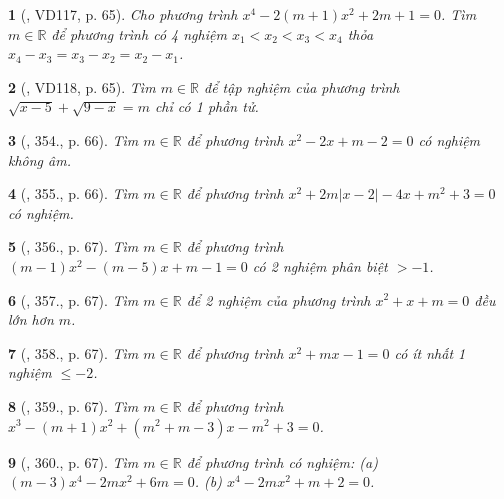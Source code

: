\documentclass{article}
\newtheorem{baitoan}{}
\begin{document}
\begin{baitoan}[\cite{Binh_Toan_9_tap_2}, VD117, p. 65]
	Cho phương trình $x^4 - 2(m + 1)x^2 + 2m + 1 = 0$. Tìm $m\in\mathbb{R}$ để phương trình có 4 nghiệm $x_1 < x_2 < x_3 < x_4$ thỏa $x_4 - x_3 = x_3 - x_2 = x_2 - x_1$.
\end{baitoan}

\begin{baitoan}[\cite{Binh_Toan_9_tap_2}, VD118, p. 65]
	Tìm $m\in\mathbb{R}$ để tập nghiệm của phương trình $\sqrt{x - 5} + \sqrt{9 - x} = m$ chỉ có 1 phần tử.
\end{baitoan}

\begin{baitoan}[\cite{Binh_Toan_9_tap_2}, 354., p. 66]
	Tìm $m\in\mathbb{R}$ để phương trình $x^2 - 2x + m - 2 = 0$ có nghiệm không âm.
\end{baitoan}

\begin{baitoan}[\cite{Binh_Toan_9_tap_2}, 355., p. 66]
	Tìm $m\in\mathbb{R}$ để phương trình $x^2 + 2m|x - 2| - 4x + m^2 + 3 = 0$ có nghiệm.
\end{baitoan}

\begin{baitoan}[\cite{Binh_Toan_9_tap_2}, 356., p. 67]
	Tìm $m\in\mathbb{R}$ để phương trình $(m - 1)x^2 - (m - 5)x + m - 1 = 0$ có 2 nghiệm phân biệt $> -1$.
\end{baitoan}

\begin{baitoan}[\cite{Binh_Toan_9_tap_2}, 357., p. 67]
	Tìm $m\in\mathbb{R}$ để 2 nghiệm của phương trình $x^2 + x + m = 0$ đều lớn hơn $m$.
\end{baitoan}

\begin{baitoan}[\cite{Binh_Toan_9_tap_2}, 358., p. 67]
	Tìm $m\in\mathbb{R}$ để phương trình $x^2 + mx - 1 = 0$ có ít nhất 1 nghiệm $\le-2$.
\end{baitoan}

\begin{baitoan}[\cite{Binh_Toan_9_tap_2}, 359., p. 67]
	Tìm $m\in\mathbb{R}$ để phương trình $x^3 - (m + 1)x^2 + (m^2 + m - 3)x - m^2 + 3 = 0$.
\end{baitoan}

\begin{baitoan}[\cite{Binh_Toan_9_tap_2}, 360., p. 67]
	Tìm $m\in\mathbb{R}$ để phương trình có nghiệm: (a) $(m - 3)x^4 - 2mx^2 + 6m = 0$. (b) $x^4 - 2mx^2 + m + 2 = 0$.
\end{baitoan}
\end{document}
